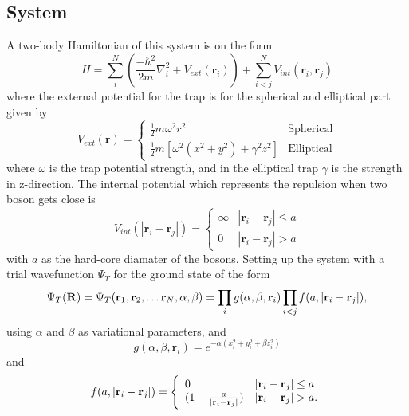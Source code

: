 \documentclass[12pt]{article}
\begin{document}
  \subsection{System}
  A two-body Hamiltonian of this system is on the form
  \begin{equation}
     H = \sum_i^N \left(\frac{-\hbar^2}{2m}\nabla^2_i + V_{ext}(\bm{r}_i)\right) + %
     \sum_{i< j}^N V_{int}(\bm{r}_i,\bm{r}_j)
  \end{equation}
  where the external potential for the trap is for the spherical and elliptical part
  given by
  \begin{equation}
    V_{ext}(\bm{r}) = \left\{%
      \begin{array}{lr}
	\frac{1}{2}m\omega^2r^2 & \text{Spherical}\\
	\frac{1}{2}m[\omega^2(x^2 + y^2) + \gamma^2z^2] & \text{Elliptical}
      \end{array}
      \right.
  \end{equation}
  where $\omega$ is the trap potential strength, and in the elliptical trap $\gamma$ is
  the strength in z-direction.
  The internal potential which represents the repulsion when two boson gets close is
  \begin{equation}
    V_{int}(|\bm{r}_i - \bm{r}_j|) = \left\{%
    \begin{array}{lr}
      \infty & |\bm{r}_i - \bm{r}_j| \leq a\\
      0 & |\bm{r}_i - \bm{r}_j| > a
    \end{array}
    \right.
  \end{equation}
  with $a$ as the hard-core diamater of the bosons.
  Setting up the system with a trial wavefunction $\Psi_T$ for the ground state of the form
  \begin{equation}
    \Psi_T({\bf R})=\Psi_T({\bf r}_1, {\bf r}_2, \dots {\bf r}_N,\alpha,\beta)=\prod_i%
    g(\alpha,\beta,{\bf r}_i)\prod_{i<j}f(a,|{\bf r}_i-{\bf r}_j|),
  \end{equation}
  using $\alpha$ and $\beta$ as variational parameters, and 
  \[ g(\alpha, \beta, \bm{r}_i) = e^{-\alpha(x_i^2 + y_i^2 + \beta z_i^2)} \]
  and
  \begin{equation}
    f(a,|{\bf r}_i-{\bf r}_j|)=\Bigg\{
    \begin{array}{ll}
      0 & {|{\bf r}_i-{\bf r}_j|} \leq {a}\\
	(1-\frac{a}{|{\bf r}_i-{\bf r}_j|}) & {|{\bf r}_i-{\bf r}_j|} > {a}.
    \end{array}
  \end{equation}  
\end{document}
